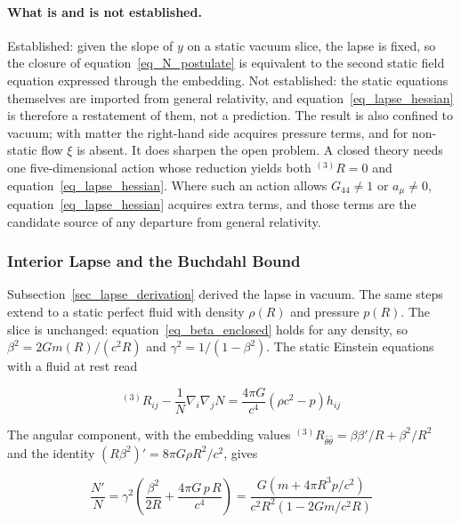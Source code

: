 \documentclass[pdflatex,sn-mathphys-num]{sn-jnl}%
\theoremstyle{thmstyleone}%
\theoremstyle{thmstyletwo}%
\theoremstyle{thmstylethree}%
\begin{document}
\paragraph{What is and is not established.}
Established: given the slope of $y$ on a static vacuum slice, the lapse is fixed, so the closure of equation~\eqref{eq_N_postulate} is equivalent to the second static field equation expressed through the embedding. Not established: the static equations themselves are imported from general relativity, and equation~\eqref{eq_lapse_hessian} is therefore a restatement of them, not a prediction. The result is also confined to vacuum; with matter the right-hand side acquires pressure terms, and for non-static flow $\xi$ is absent. It does sharpen the open problem. A closed theory needs one five-dimensional action whose reduction yields both ${}^{(3)}\!R=0$ and equation~\eqref{eq_lapse_hessian}. Where such an action allows $G_{44}\neq1$ or $a_\mu\neq0$, equation~\eqref{eq_lapse_hessian} acquires extra terms, and those terms are the candidate source of any departure from general relativity.

\subsubsection{Interior Lapse and the Buchdahl Bound}\label{sec_interior_lapse}

Subsection~\ref{sec_lapse_derivation} derived the lapse in vacuum. The same steps extend to a static perfect fluid with density $\rho(R)$ and pressure $p(R)$. The slice is unchanged: equation~\eqref{eq_beta_enclosed} holds for any density, so $\beta^2=2Gm(R)/(c^2R)$ and $\gamma^2=1/(1-\beta^2)$. The static Einstein equations with a fluid at rest read

\begin{equation}
    {}^{(3)}\!R_{ij}-\frac{1}{N}\nabla_i\nabla_jN=\frac{4\pi G}{c^{4}}\left(\rho c^{2}-p\right)h_{ij}
\end{equation}

The angular component, with the embedding values ${}^{(3)}\!R_{\hat\theta\hat\theta}=\beta\beta'/R+\beta^2/R^2$ and the identity $\left(R\beta^2\right)'=8\pi G\rho R^2/c^2$, gives

\begin{equation}\label{eq_interior_lapse}
    \frac{N'}{N}=\gamma^{2}\left(\frac{\beta^{2}}{2R}+\frac{4\pi G\,p\,R}{c^{4}}\right)
    =\frac{G\left(m+4\pi R^{3}p/c^{2}\right)}{c^{2}R^{2}\left(1-2Gm/c^{2}R\right)}
\end{equation}
\end{document}
